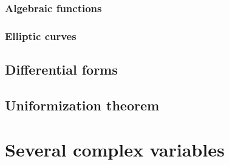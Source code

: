 \documentclass{../note}
\begin{document}
\section{Algebraic functions}
\section{Elliptic curves}

\chapter{Differential forms}

\chapter{Uniformization theorem}




\part{Several complex variables}
\end{document}

